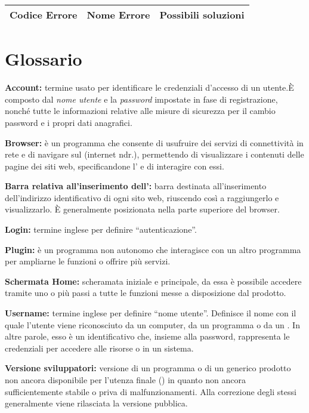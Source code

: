 \begin{center}
\begin{longtable}{llp{}}
\toprule Codice Errore & Nome Errore  & Possibili soluzioni\\
\midrule
\bottomrule
\end{longtable}
\end{center}

\section{Glossario}
\begin{description}
\item\textbf{Account:} termine usato per identificare le credenziali d'accesso di un utente.È composto dal \textit{nome utente} e la \textit{password} impostate in fase di registrazione, nonché tutte le informazioni relative alle misure di sicurezza per il cambio password e i propri dati anagrafici.
\item\textbf{Browser:} è un programma che consente di usufruire dei servizi di connettività in rete e di navigare sul  (internet ndr.), permettendo di visualizzare i contenuti delle pagine dei siti web, specificandone l' e di interagire con essi.
\item\textbf{Barra relativa all'inserimento dell':} barra destinata all'inserimento dell'indirizzo identificativo di ogni sito web, riuscendo così a raggiungerlo e visualizzarlo. È generalmente posizionata nella parte superiore del browser.
\item\textbf{Login:} termine inglese per definire ``autenticazione''.
\item\textbf{Plugin:} è un programma non autonomo che interagisce con un altro programma per ampliarne le funzioni o offrire più servizi.
\item\textbf{Schermata Home:} scheramata iniziale e principale, da essa è possibile accedere tramite uno o più passi a tutte le funzioni messe a disposizione dal prodotto.
\item\textbf{Username:} termine inglese per definire ``nome utente''. Definisce il nome con il quale l'utente viene riconosciuto da un computer, da un programma o da un . In altre parole, esso è un identificativo che, insieme alla password, rappresenta le credenziali per accedere alle risorse o in un sistema.
\item\textbf{Versione sviluppatori:} versione di un programma o di un generico prodotto non ancora disponibile per l'utenza finale () in quanto non ancora sufficientemente  stabile o priva di malfunzionamenti. Alla correzione degli stessi generalmente viene rilasciata la versione pubblica.
\end{description}


